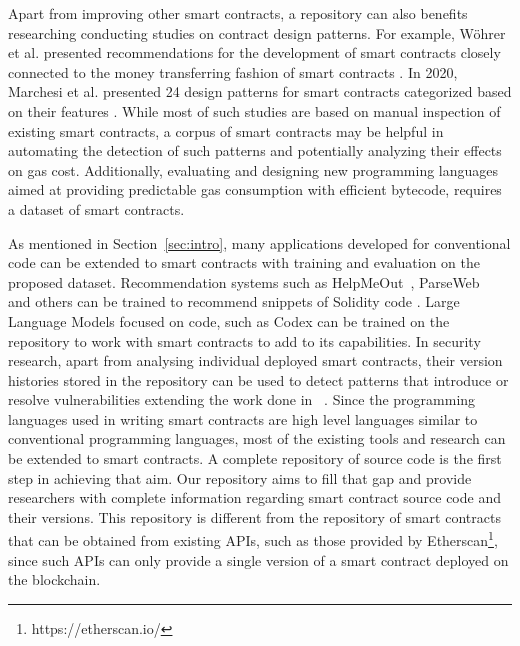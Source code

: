 \documentclass[10pt,conference]{IEEEtran}
\begin{document}
	Apart from improving other smart contracts, a repository can also benefits researching conducting studies on contract design patterns. For example, Wöhrer et al. presented recommendations for the development of smart contracts closely connected to the money transferring fashion of smart contracts \cite{wohrer}. In 2020, Marchesi et al. presented 24 design patterns for smart contracts categorized based on their features \cite{marchesi}. While most of such studies are based on manual inspection of existing smart contracts, a corpus of smart contracts may be helpful in automating the detection of such patterns and potentially analyzing their effects on gas cost. Additionally, evaluating and designing new programming languages aimed at providing predictable gas consumption with efficient bytecode, requires a dataset of smart contracts.
	
	As mentioned in Section~\ref{sec:intro}, many applications developed for conventional code can be extended to smart contracts with training and evaluation on the proposed dataset.  Recommendation systems such as HelpMeOut~\cite{helpmeout}, ParseWeb~\cite{parseweb} and others can be trained to recommend snippets of Solidity code . Large Language Models focused on code, such as Codex \cite{codex} can be trained on the repository to work with smart contracts to add to its capabilities. In security research, apart from analysing individual deployed smart contracts, their version histories stored in the repository can be used to detect patterns that introduce or resolve vulnerabilities extending the work done in ~\cite{securitydataset}. Since the programming languages used in writing smart contracts are high level languages similar to conventional programming languages, most of the existing tools and research can be extended to smart contracts. A complete repository of source code is the first step in achieving that aim. Our repository aims to fill that gap and provide researchers with complete information regarding smart contract source code and their versions. This repository is different from the repository of smart contracts that can be obtained from existing APIs, such as those provided by Etherscan\footnote{https://etherscan.io/}, since such APIs can only provide a single version of a smart contract deployed on the blockchain.
	
	
	
\end{document}
